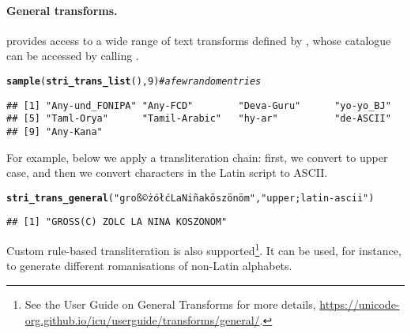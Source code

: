 \documentclass[nojss]{jss}\usepackage[]{graphicx}\usepackage[]{xcolor}
\makeatletter
\newcommand{\hlnum}[1]{\textcolor[rgb]{0.686,0.059,0.569}{#1}}%
\newcommand{\hlstr}[1]{\textcolor[rgb]{0.192,0.494,0.8}{#1}}%
\newcommand{\hlcom}[1]{\textcolor[rgb]{0.678,0.584,0.686}{\textit{#1}}}%
\newcommand{\hlstd}[1]{\textcolor[rgb]{0.345,0.345,0.345}{#1}}%
\newcommand{\hlkwd}[1]{\textcolor[rgb]{0.737,0.353,0.396}{\textbf{#1}}}%
\newenvironment{kframe}{%
 \def\at@end@of@kframe{}%
 \ifinner\ifhmode%
  \def\at@end@of@kframe{\end{minipage}}%
  \begin{minipage}{\columnwidth}%
 \fi\fi%
 \def\FrameCommand##1{\hskip\@totalleftmargin \hskip-\fboxsep
 \colorbox{shadecolor}{##1}\hskip-\fboxsep
     \hskip-\linewidth \hskip-\@totalleftmargin \hskip\columnwidth}%
 \MakeFramed {\advance\hsize-\width
   \@totalleftmargin\z@ \linewidth\hsize
   \@setminipage}}%
 {\par\unskip\endMakeFramed%
 \at@end@of@kframe}
\newenvironment{knitrout}{}{} %
\makeatother
\begin{document}
\paragraph{General transforms.}
 provides access to a wide range of text transforms
defined by , whose catalogue can be accessed by calling
.

\begin{knitrout}
\color{fgcolor}\begin{kframe}
\begin{alltt}
\hlkwd{sample}\hlstd{(}\hlkwd{stri_trans_list}\hlstd{(),} \hlnum{9}\hlstd{)}  \hlcom{# a few random entries}
\end{alltt}
\begin{verbatim}
## [1] "Any-und_FONIPA" "Any-FCD"        "Deva-Guru"      "yo-yo_BJ"      
## [5] "Taml-Orya"      "Tamil-Arabic"   "hy-ar"          "de-ASCII"      
## [9] "Any-Kana"
\end{verbatim}
\end{kframe}
\end{knitrout}

For example, below we apply a transliteration chain:
first, we convert to upper case, and then we convert characters
in the Latin script to ASCII.


\begin{knitrout}
\color{fgcolor}\begin{kframe}
\begin{alltt}
\hlkwd{stri_trans_general}\hlstd{(}\hlstr{"groß© żółć La Niña köszönöm"}\hlstd{,} \hlstr{"upper; latin-ascii"}\hlstd{)}
\end{alltt}
\begin{verbatim}
## [1] "GROSS(C) ZOLC LA NINA KOSZONOM"
\end{verbatim}
\end{kframe}
\end{knitrout}


Custom rule-based transliteration is also
supported\footnote{See the  User Guide on {General Transforms}
for more details,
\url{https://unicode-org.github.io/icu/userguide/transforms/general/}.
}. It can be used, for instance, to generate different romanisations
of non-Latin alphabets.
\end{document}

